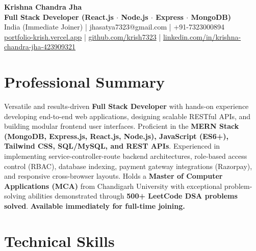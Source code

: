 \documentclass[a4paper,10pt]{article}
\begin{document}
\begin{center}

    {\LARGE \textbf{Krishna Chandra Jha}} \\[2.5pt]

    \textbf{Full Stack Developer (React.js $\cdot$ Node.js $\cdot$ Express $\cdot$ MongoDB)} \\[3.5pt]

    India (Immediate Joiner)
    \quad | \quad
    jhasatya7323@gmail.com
    \quad | \quad
    +91-7323000894
    \\[2.5pt]

    \href{https://portfolio-ashen-alpha-dv0whhsamo.vercel.app/}{portfolio-krish.vercel.app}
    \quad | \quad
    \href{https://github.com/krish7323}{github.com/krish7323}
    \quad | \quad
    \href{https://linkedin.com/in/krishna-chandra-jha-423909321}
    {linkedin.com/in/krishna-chandra-jha-423909321}

\end{center}

\section*{Professional Summary}

Versatile and results-driven \textbf{Full Stack Developer} with hands-on experience developing end-to-end web applications, designing scalable RESTful APIs, and building modular frontend user interfaces. Proficient in the \textbf{MERN Stack (MongoDB, Express.js, React.js, Node.js), JavaScript (ES6+), Tailwind CSS, SQL/MySQL, and REST APIs}. Experienced in implementing service-controller-route backend architectures, role-based access control (RBAC), database indexing, payment gateway integrations (Razorpay), and responsive cross-browser layouts. Holds a \textbf{Master of Computer Applications (MCA)} from Chandigarh University with exceptional problem-solving abilities demonstrated through \textbf{500+ LeetCode DSA problems solved}. \textbf{Available immediately for full-time joining.}

\section*{Technical Skills}
\end{document}
